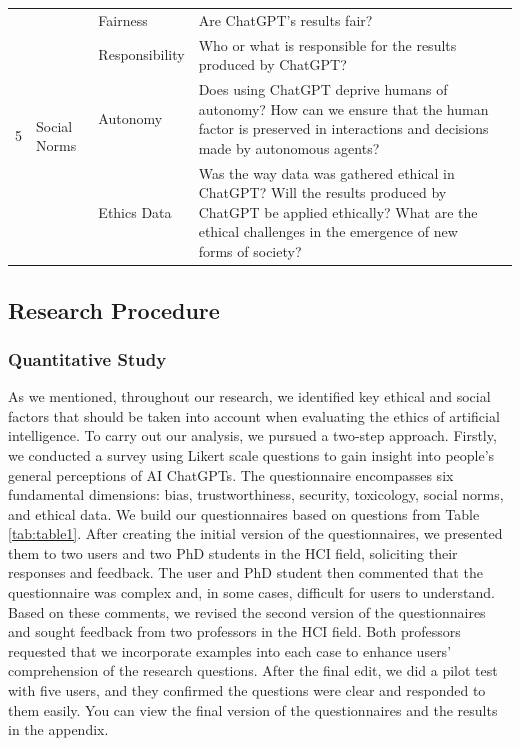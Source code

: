 \documentclass[sigconf]{acmart}
\begin{document}
\begin{table}[h]
\begin{tabularx}{\textwidth}{p{0.4cm} p{2.1cm} p{2cm} X p{1.5cm}}
\multirow{4}{*}{5} & \multirow{4}{*}{Social Norms} & Fairness & Are ChatGPT's results fair? & \cite{Zhang2023Is} \\
 & & Responsibility & Who or what is responsible for the results produced by ChatGPT? & \cite{Wang2023Large} \\
 & & Autonomy & Does using ChatGPT deprive humans of autonomy? How can we ensure that the human factor is preserved in interactions and decisions made by autonomous agents? & \cite{Chandel2019Chatbot, Ray2023ChatGPT} \\
\midrule
6 & Ethics & Ethics Data & Was the way data was gathered ethical in ChatGPT? Will the results produced by ChatGPT be applied ethically? What are the ethical challenges in the emergence of new forms of society? & \cite{Zhu2022AI} \\
\bottomrule
\end{tabularx}%

\end{table}


\subsection{Research Procedure}

\subsubsection{Quantitative Study}

As we mentioned, throughout our research, we identified key ethical and social factors that should be taken into account when evaluating the ethics of artificial intelligence. To carry out our analysis, we pursued a two-step approach. Firstly, we conducted a survey using Likert scale questions to gain insight into people's general perceptions of AI ChatGPTs. The questionnaire encompasses six fundamental dimensions: bias, trustworthiness, security, toxicology, social norms, and ethical data. We build our questionnaires based on questions from Table \ref{tab:table1}. After creating the initial version of the questionnaires, we presented them to two users and two PhD students in the HCI field, soliciting their responses and feedback. The user and PhD student then commented that the questionnaire was complex and, in some cases, difficult for users to understand. Based on these comments, we revised the second version of the questionnaires and sought feedback from two professors in the HCI field. Both professors requested that we incorporate examples into each case to enhance users' comprehension of the research questions. After the final edit, we did a pilot test with five users, and they confirmed the questions were clear and responded to them easily. You can view the final version of the questionnaires and the results in the appendix.
\end{document}
